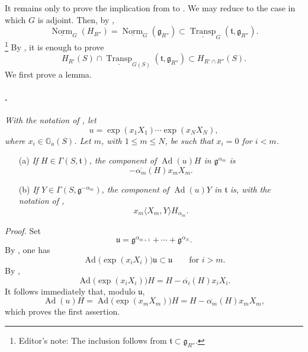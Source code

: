 It remains only to prove the implication from \textup{} to
\textup{}. We may reduce to the case in which \(G\) is adjoint.
Then, by ,
\[
  \underline{\operatorname{Norm}}_G(H_{R''})
  =
  \underline{\operatorname{Norm}}_G(\mathfrak g_{R''})
  \subset
  \underline{\operatorname{Transp}}_G
    (\mathfrak t,\mathfrak g_{R''}).
  \tag{39}\label{sga3:xxii:subsection:5-6:equation:39}
\]
\footnote{Editor's note: The inclusion follows from
\(\mathfrak t\subset\mathfrak g_{R''}\).}
By , it is enough to prove
\[
  H_{R'}(S)\cap
  \underline{\operatorname{Transp}}_{G(S)}
    (\mathfrak t,\mathfrak g_{R''})
  \subset
  H_{R'\cap R''}(S).
  \tag{x}\label{sga3:xxii:subsection:5-6:equation:x}
\]
We first prove a lemma.

\paragraph{.}
\textit{With the notation of , let}
\[
  u=\exp(x_1X_1)\cdots\exp(x_NX_N),
\]
\textit{where \(x_i\in\mathbb G_a(S)\). Let \(m\), with
\(1\leq m\leq N\), be such that \(x_i=0\) for \(i<m\).}
\begin{enumerate}
\item[\textup{\SGAInlineRefTarget{sga3:xxii:lem:5.6.2:item:a}(a)}]
\textit{If \(H\in\Gamma(S,\mathfrak t)\), the component of
\(\operatorname{Ad}(u)H\) in \(\mathfrak g^{\alpha_m}\) is}
\[
  -\overline{\alpha_m}(H)x_mX_m.
\]

\item[\textup{(b)}]
\textit{If \(Y\in\Gamma(S,\mathfrak g^{-\alpha_m})\), the component
of \(\operatorname{Ad}(u)Y\) in \(\mathfrak t\) is, with the notation
of ,}
\[
  x_m\langle X_m,Y\rangle H_{\alpha_m}.
\]
\end{enumerate}

\textit{Proof.}
Set
\[
  \mathfrak u
  =
  \mathfrak g^{\alpha_{m+1}}+\cdots+\mathfrak g^{\alpha_N}.
\]
By , one has
\[
  \operatorname{Ad}\bigl(\exp(x_iX_i)\bigr)\mathfrak u
  \subset\mathfrak u
  \qquad\text{for }i>m.
\]
By ,
\[
  \operatorname{Ad}\bigl(\exp(x_iX_i)\bigr)H
  =
  H-\overline{\alpha_i}(H)x_iX_i.
\]
It follows immediately that, modulo \(\mathfrak u\),
\[
  \operatorname{Ad}(u)H
  =
  \operatorname{Ad}\bigl(\exp(x_mX_m)\bigr)H
  =
  H-\overline{\alpha_m}(H)x_mX_m,
\]
which proves the first assertion.

